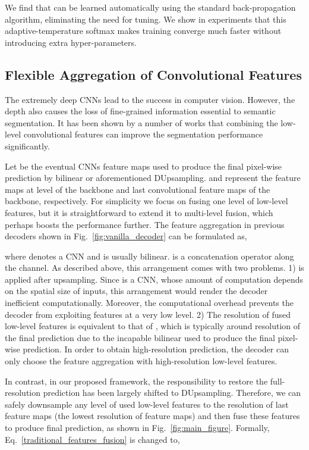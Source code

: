\documentclass[10pt,twocolumn,letterpaper]{article}
\newcommand{\1}{{\mathbbm{1}}}
\begin{document}
We find that  can be learned automatically using the standard back-propagation algorithm, eliminating the need for tuning. We show in experiments that this adaptive-temperature softmax makes training converge much faster without introducing extra hyper-parameters.


\subsection{Flexible Aggregation of Convolutional Features}
The extremely deep CNNs \cite{he2016deep, chollet2017xception, huang2017densely} lead to the success in computer vision. However, the depth also causes the loss of fine-grained information essential to semantic segmentation. It has been shown by a number of works \cite{lin2017refinenet, chen2018encoder} that combining the low-level convolutional features can improve the segmentation performance significantly.

Let  be the eventual CNNs feature maps used to produce the final pixel-wise prediction by bilinear or aforementioned DUpsampling.  and  represent the feature maps at level  of the backbone and last convolutional feature maps of the backbone, respectively.  For simplicity we focus on fusing one level of low-level features, but it is straightforward to extend it to multi-level fusion, which perhaps boosts the performance further. The feature aggregation in previous decoders shown in Fig.~\ref{fig:vanilla_decoder} can be formulated as,

where  denotes a CNN and  is usually bilinear.
 is a concatenation operator  along the channel. As described above, this arrangement comes with two problems. 1)   is applied after upsampling. Since  is a CNN, whose amount of computation depends on the spatial size of inputs, this arrangement would render the decoder inefficient computationally. Moreover, the computational overhead prevents the decoder from exploiting features at a very low level. 2) The resolution of fused low-level features  is equivalent to that of ,
which is typically around   resolution of the final prediction due to the incapable bilinear used to produce the final pixel-wise prediction. In order to obtain high-resolution prediction, the decoder can only choose the feature aggregation with high-resolution low-level features.

In contrast, in our proposed framework, the  responsibility to restore the full-resolution prediction has been largely shifted to DUpsampling. Therefore, we can safely downsample  any level of used low-level features to the resolution of last feature maps  (the lowest resolution of feature maps) and then fuse these features to produce final prediction, as shown in Fig.~\ref{fig:main_figure}. Formally, Eq.~\eqref{traditional_features_fusion} is changed to,
\end{document}
